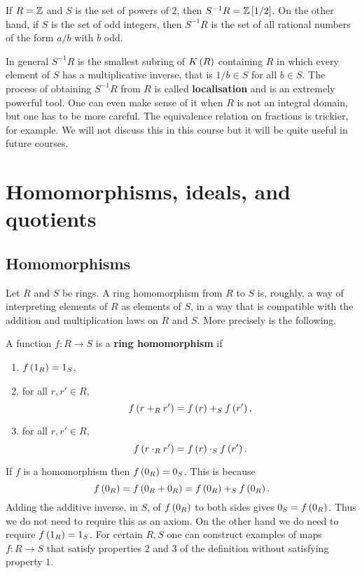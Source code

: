 \begin{example*}
If $ R = \mathbb{Z} $ and $ S $ is the set of powers of $ 2 $, then $ S^{-1}R = \mathbb{Z}\left[ 1 / 2 \right] $. On the other hand, if $ S $ is the set of odd integers, then $ S^{-1}R $ is the set of all rational numbers of the form $ a / b $ with $ b $ odd.
\end{example*}

In general $ S^{-1}R $ is the smallest subring of $ K\left( R \right) $ containing $ R $ in which every element of $ S $ has a multiplicative inverse, that is $ 1 / b \in S $ for all $ b \in S $. The process of obtaining $ S^{-1}R $ from $ R $ is called \textbf{localisation} and is an extremely powerful tool. One can even make sense of it when $ R $ is not an integral domain, but one has to be more careful. The equivalence relation on fractions is trickier, for example. We will not discuss this in this course but it will be quite useful in future courses.

\pagebreak

\section{Homomorphisms, ideals, and quotients}

\subsection{Homomorphisms}

Let $ R $ and $ S $ be rings. A ring homomorphism from $ R $ to $ S $ is, roughly, a way of interpreting elements of $ R $ as elements of $ S $, in a way that is compatible with the addition and multiplication laws on $ R $ and $ S $. More precisely is the following.

\begin{definition}
A function $ f : R \to S $ is a \textbf{ring homomorphism} if
\begin{enumerate}
\item $ f\left( 1_R \right) = 1_S $,
\item for all $ r, r' \in R $,
$$ f\left( r +_R r' \right) = f\left( r \right) +_S f\left( r' \right), $$
\item for all $ r, r' \in R $,
$$ f\left( r \cdot_R r' \right) = f\left( r \right) \cdot_S f\left( r' \right). $$
\end{enumerate}
\end{definition}

\begin{note*}
If $ f $ is a homomorphism then $ f\left( 0_R \right) = 0_S $. This is because
$$ f\left( 0_R \right) = f\left( 0_R + 0_R \right) = f\left( 0_R \right) +_S f\left( 0_R \right). $$
Adding the additive inverse, in $ S $, of $ f\left( 0_R \right) $ to both sides gives $ 0_S = f\left( 0_R \right) $. Thus we do not need to require this as an axiom. On the other hand we do need to require $ f\left( 1_R \right) = 1_S $. For certain $ R, S $ one can construct examples of maps $ f : R \to S $ that satisfy properties $ 2 $ and $ 3 $ of the definition without satisfying property $ 1 $.
\end{note*}

